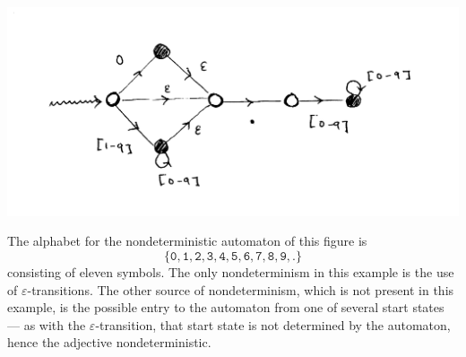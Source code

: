     \begin{center}
        \includegraphics[scale=0.1]{resources/decimal-NFA.pdf}
    \end{center}

\begin{eg}
    The alphabet for the nondeterministic automaton of this figure is
    $$\mathtt{\{0,1,2,3,4,5,6,7,8,9,.\}}$$ consisting of eleven
    symbols. The only nondeterminism in this example is the use of
    $\varepsilon$-transitions. The other source of nondeterminism,
    which is not present in this example, is the possible entry to the
    automaton from one of several start states --- as with the
    $\varepsilon$-transition, that start state is not determined by
    the automaton, hence the adjective nondeterministic.
\end{eg}


